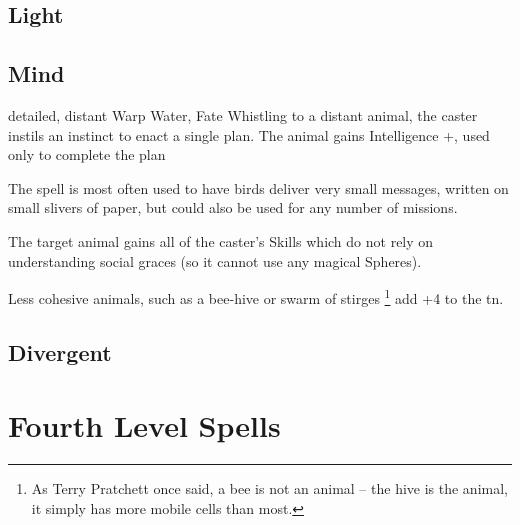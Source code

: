 \begin{multicols}{2}
\subsection{Light}


\subsection{Mind}

  {detailed, distant}%
  {Warp}%
  {Water, Fate}%
  {}%
  {Whistling to a distant animal, the caster instils an instinct to enact a single plan.
  The animal gains Intelligence +, used only to complete the plan}%
  {
  The spell is most often used to have birds deliver very small messages, written on small slivers of paper, but could also be used for any number of missions.

  The target animal gains all of the caster's Skills which do not rely on understanding social graces (so it cannot use any magical Spheres).

  Less cohesive animals, such as a bee-hive or swarm of stirges%
  \footnote{As Terry Pratchett once said, a bee is not an animal -- the hive is the animal, it simply has more mobile cells than most.}
  add +4 to the \gls{tn}.
  }


\needspace{18em}
\subsection{Divergent}



\end{multicols}

\section{Fourth Level Spells}

